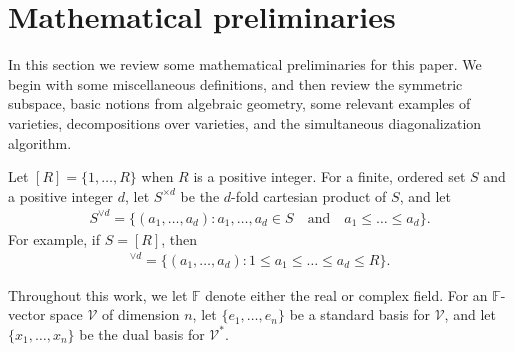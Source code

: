 \documentclass[11pt]{article}
\theoremstyle{definition}
\newcommand{\field}{\mathbb{F}}
\newcommand\W{\mathcal{W}}
\newcommand\V{\mathcal{V}}
\newcommand{\w}{{\wedge}}
\def\ba#1\ea{\begin{align}#1\end{align}}
\begin{document}

\section{Mathematical preliminaries} \label{sec:prelim}
In this section we review some mathematical preliminaries for this paper. We begin with some miscellaneous definitions, and then review the symmetric subspace, basic notions from algebraic geometry, some relevant examples of varieties, decompositions over varieties, and the simultaneous diagonalization algorithm.

Let $[R]=\{1,\dots, R\}$ when $R$ is a positive integer. For a finite, ordered set $S$ and a positive integer $d$, let $S^{\times d}$ be the $d$-fold cartesian product of $S$, and let
\begin{align}
S^{\vee d} = \{(a_1,\dots, a_{d}): a_1,\dots, a_{d} \in S\quad \text{and}\quad a_1 \leq \dots \leq a_d\}.
\end{align}
For example, if $S=[R]$, then
\begin{align}
[R]^{\vee d} = \{(a_1,\dots, a_{d}): 1\leq a_1 \leq \dots \leq a_d\leq R \}.
\end{align}

Throughout this work, we let $\field$ denote either the real or complex field. For an $\field$-vector space $\V$ of dimension $n$, let $\{e_1,\dots, e_n\}$ be a standard basis for $\V$, and let $\{x_1,\dots, x_n\}$ be the dual basis for $\V^*$.
\end{document}

